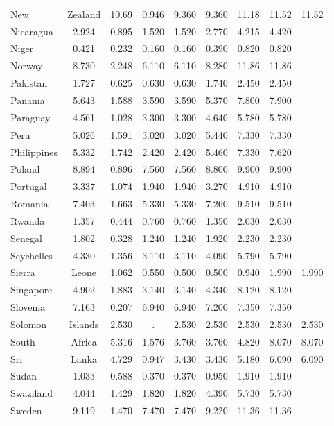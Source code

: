\documentclass[]{article}
\begin{document}
\begin{tabular}{lcccccccc}
New & Zealand & 10.69 & 0.946 & 9.360 & 9.360 & 11.18 & 11.52 & 11.52 \\
Nicaragua & 2.924 & 0.895 & 1.520 & 1.520 & 2.770 & 4.215 & 4.420 &  \\
Niger & 0.421 & 0.232 & 0.160 & 0.160 & 0.390 & 0.820 & 0.820 &  \\
Norway & 8.730 & 2.248 & 6.110 & 6.110 & 8.280 & 11.86 & 11.86 &  \\
Pakistan & 1.727 & 0.625 & 0.630 & 0.630 & 1.740 & 2.450 & 2.450 &  \\
Panama & 5.643 & 1.588 & 3.590 & 3.590 & 5.370 & 7.800 & 7.900 &  \\
Paraguay & 4.561 & 1.028 & 3.300 & 3.300 & 4.640 & 5.780 & 5.780 &  \\
Peru & 5.026 & 1.591 & 3.020 & 3.020 & 5.440 & 7.330 & 7.330 &  \\
Philippines & 5.332 & 1.742 & 2.420 & 2.420 & 5.460 & 7.330 & 7.620 &  \\
Poland & 8.894 & 0.896 & 7.560 & 7.560 & 8.800 & 9.900 & 9.900 &  \\
Portugal & 3.337 & 1.074 & 1.940 & 1.940 & 3.270 & 4.910 & 4.910 &  \\
Romania & 7.403 & 1.663 & 5.330 & 5.330 & 7.260 & 9.510 & 9.510 &  \\
Rwanda & 1.357 & 0.444 & 0.760 & 0.760 & 1.350 & 2.030 & 2.030 &  \\
Senegal & 1.802 & 0.328 & 1.240 & 1.240 & 1.920 & 2.230 & 2.230 &  \\
Seychelles & 4.330 & 1.356 & 3.110 & 3.110 & 4.090 & 5.790 & 5.790 &  \\
Sierra & Leone & 1.062 & 0.550 & 0.500 & 0.500 & 0.940 & 1.990 & 1.990 \\
Singapore & 4.902 & 1.883 & 3.140 & 3.140 & 4.340 & 8.120 & 8.120 &  \\
Slovenia & 7.163 & 0.207 & 6.940 & 6.940 & 7.200 & 7.350 & 7.350 &  \\
Solomon & Islands & 2.530 & . & 2.530 & 2.530 & 2.530 & 2.530 & 2.530 \\
South & Africa & 5.316 & 1.576 & 3.760 & 3.760 & 4.820 & 8.070 & 8.070 \\
Sri & Lanka & 4.729 & 0.947 & 3.430 & 3.430 & 5.180 & 6.090 & 6.090 \\
Sudan & 1.033 & 0.588 & 0.370 & 0.370 & 0.950 & 1.910 & 1.910 &  \\
Swaziland & 4.044 & 1.429 & 1.820 & 1.820 & 4.390 & 5.730 & 5.730 &  \\
Sweden & 9.119 & 1.470 & 7.470 & 7.470 & 9.220 & 11.36 & 11.36 &  \\

\end{tabular}
\end{document}
